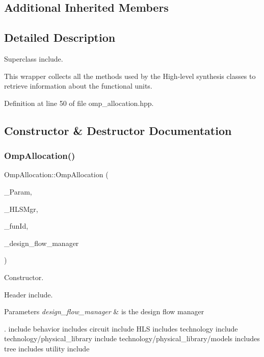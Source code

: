 \subsection*{Additional Inherited Members}


\subsection{Detailed Description}
Superclass include. 

This wrapper collects all the methods used by the High-\/level synthesis classes to retrieve information about the functional units. 

Definition at line 50 of file omp\+\_\+allocation.\+hpp.



\subsection{Constructor \& Destructor Documentation}
\mbox{\label{classOmpAllocation_a6376b0abb7993ba2d126aec27c3fea2d}} 
\subsubsection{\texorpdfstring{Omp\+Allocation()}{OmpAllocation()}}
{\footnotesize\ttfamily Omp\+Allocation\+::\+Omp\+Allocation (\begin{DoxyParamCaption}\item[{const \hyperlink{Parameter_8hpp_a37841774a6fcb479b597fdf8955eb4ea}{Parameter\+Const\+Ref}}]{\+\_\+\+Param,  }\item[{const \hyperlink{hls__manager_8hpp_acd3842b8589fe52c08fc0b2fcc813bfe}{H\+L\+S\+\_\+manager\+Ref}}]{\+\_\+\+H\+L\+S\+Mgr,  }\item[{unsigned int}]{\+\_\+fun\+Id,  }\item[{const Design\+Flow\+Manager\+Const\+Ref}]{\+\_\+design\+\_\+flow\+\_\+manager }\end{DoxyParamCaption})}



Constructor. 

Header include.


\begin{DoxyParams}{Parameters}
{\em design\+\_\+flow\+\_\+manager} & is the design flow manager\\
\hline
\end{DoxyParams}
. include behavior includes circuit include H\+LS includes technology include technology/physical\+\_\+library include technology/physical\+\_\+library/models includes tree includes utility include 

